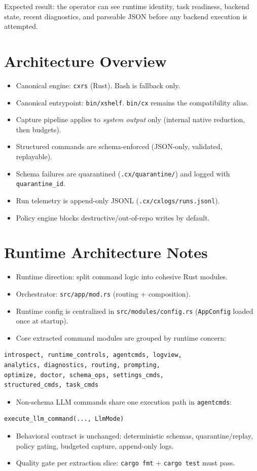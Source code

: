 \documentclass[11pt]{article}
\begin{document}
Expected result: the operator can see runtime identity, task readiness, backend state,
recent diagnostics, and parseable JSON before any backend execution is attempted.

\section*{Architecture Overview}
\begin{itemize}
  \item Canonical engine: \texttt{cxrs} (Rust). Bash is fallback only.
  \item Canonical entrypoint: \texttt{bin/xshelf}. \texttt{bin/cx} remains the compatibility alias.
  \item Capture pipeline applies to \emph{system output} only (internal native reduction, then budgets).
  \item Structured commands are schema-enforced (JSON-only, validated, replayable).
  \item Schema failures are quarantined (\texttt{.cx/quarantine/}) and logged with \texttt{quarantine\_id}.
  \item Run telemetry is append-only JSONL (\texttt{.cx/cxlogs/runs.jsonl}).
  \item Policy engine blocks destructive/out-of-repo writes by default.
\end{itemize}

\section*{Runtime Architecture Notes}
\begin{itemize}
  \item Runtime direction: split command logic into cohesive Rust modules.
  \item Orchestrator: \texttt{src/app/mod.rs} (routing + composition).
  \item Runtime config is centralized in \texttt{src/modules/config.rs} (\texttt{AppConfig} loaded once at startup).
  \item Core extracted command modules are grouped by runtime concern:
\end{itemize}
\begin{lstlisting}[style=cx]
introspect, runtime_controls, agentcmds, logview,
analytics, diagnostics, routing, prompting,
optimize, doctor, schema_ops, settings_cmds,
structured_cmds, task_cmds
\end{lstlisting}
\begin{itemize}
  \item Non-schema LLM commands share one execution path in \texttt{agentcmds}:
\end{itemize}
\begin{lstlisting}[style=cx]
execute_llm_command(..., LlmMode)
\end{lstlisting}
\begin{itemize}
  \item Behavioral contract is unchanged: deterministic schemas, quarantine/replay, policy gating, budgeted capture, append-only logs.
  \item Quality gate per extraction slice: \texttt{cargo fmt} + \texttt{cargo test} must pass.
\end{itemize}
\end{document}
